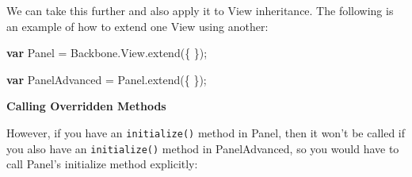 \documentclass[9pt]{book}
\newenvironment{Shaded}{}{}
\newcommand{\KeywordTok}[1]{\textcolor[rgb]{0.00,0.44,0.13}{\textbf{{#1}}}}
\newcommand{\OtherTok}[1]{\textcolor[rgb]{0.00,0.44,0.13}{{#1}}}
\newcommand{\FunctionTok}[1]{\textcolor[rgb]{0.02,0.16,0.49}{{#1}}}
\newcommand{\NormalTok}[1]{{#1}}
\begin{document}
We can take this further and also apply it to View inheritance. The
following is an example of how to extend one View using another:

\begin{Shaded}
\begin{Highlighting}[]
\KeywordTok{var} \NormalTok{Panel = }\OtherTok{Backbone}\NormalTok{.}\OtherTok{View}\NormalTok{.}\FunctionTok{extend}\NormalTok{(\{}
\NormalTok{\});}

\KeywordTok{var} \NormalTok{PanelAdvanced = }\OtherTok{Panel}\NormalTok{.}\FunctionTok{extend}\NormalTok{(\{}
\NormalTok{\});}
\end{Highlighting}
\end{Shaded}

\textbf{Calling Overridden Methods}

However, if you have an \texttt{initialize()} method in Panel, then it
won't be called if you also have an \texttt{initialize()} method in
PanelAdvanced, so you would have to call Panel's initialize method
explicitly:
\end{document}
